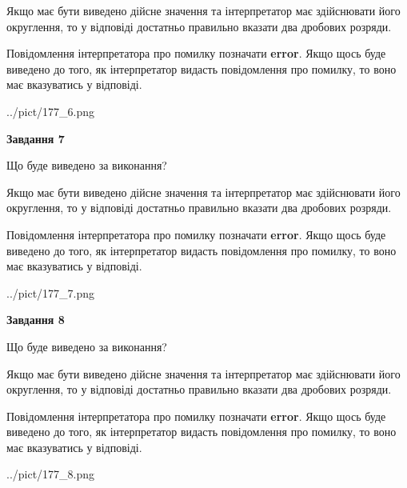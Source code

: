 \documentclass[12pt, ukrainian]{article}
\begin{document}
{\begin {Large}
Якщо має бути виведено дійсне значення та інтерпретатор має здійснювати його округлення, 
то у відповіді достатньо правильно вказати два дробових розряди.

Повідомлення інтерпретатора про помилку позначати \textbf{error}.
Якщо щось буде виведено до того, як інтерпретатор видасть повідомлення про помилку, 
то воно має вказуватись у відповіді. \par

\begin{center}
	{../pict/177_6.png}
\end{center}
\newpage

{\begin {center}\textbf{Завдання 7}\end {center}}\par
Що буде виведено за виконання? \par

Якщо має бути виведено дійсне значення та інтерпретатор має здійснювати його округлення, 
то у відповіді достатньо правильно вказати два дробових розряди.

Повідомлення інтерпретатора про помилку позначати \textbf{error}.
Якщо щось буде виведено до того, як інтерпретатор видасть повідомлення про помилку, 
то воно має вказуватись у відповіді. \par

\begin{center}
	{../pict/177_7.png}
\end{center}
\newpage

{\begin {center}\textbf{Завдання 8}\end {center}}\par
Що буде виведено за виконання? \par

Якщо має бути виведено дійсне значення та інтерпретатор має здійснювати його округлення, 
то у відповіді достатньо правильно вказати два дробових розряди.

Повідомлення інтерпретатора про помилку позначати \textbf{error}.
Якщо щось буде виведено до того, як інтерпретатор видасть повідомлення про помилку, 
то воно має вказуватись у відповіді. \par

\begin{center}
	{../pict/177_8.png}
\end{center}
\newpage


\end{Large}}
\end{document}
